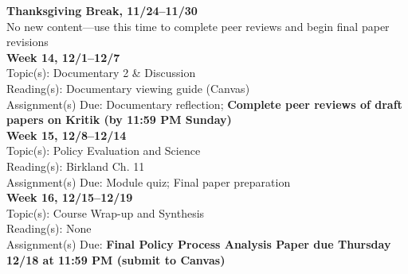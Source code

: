 \documentclass[12pt]{article}     %
\begin{document}
\noindent \textbf{Thanksgiving Break, 11/24--11/30}\\
No new content---use this time to complete peer reviews and begin final paper revisions\\

\noindent \textbf{Week 14, 12/1--12/7}\\
Topic(s): Documentary 2 \& Discussion\\
Reading(s): Documentary viewing guide (Canvas)\\
Assignment(s) Due: Documentary reflection; \textbf{Complete peer reviews of draft papers on Kritik (by 11:59 PM Sunday)}\\

\noindent \textbf{Week 15, 12/8--12/14}\\
Topic(s): Policy Evaluation and Science\\
Reading(s): Birkland Ch. 11\\
Assignment(s) Due: Module quiz; Final paper preparation\\

\noindent \textbf{Week 16, 12/15--12/19}\\
Topic(s): Course Wrap-up and Synthesis\\
Reading(s): None\\
Assignment(s) Due: \textbf{Final Policy Process Analysis Paper due Thursday 12/18 at 11:59 PM (submit to Canvas)}\\
\end{document}
